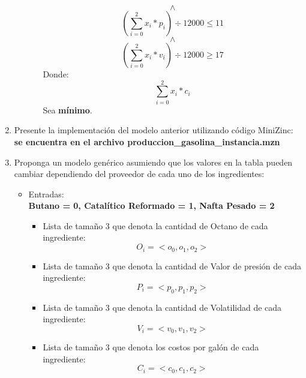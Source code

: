 \documentclass[12pt]{article}
\begin{document}
\begin{enumerate}[label=\alph*]
\begin{justify}
\begin{itemize}
\begin{itemize}
\begin{equation*}
\land
\end{equation*}
\begin{equation*}
(\sum_{i = 0}^{2} x_{i} * p_{i}) \div 12000 \leq 11
\end{equation*}
\begin{equation*}
\land
\end{equation*}
\begin{equation*}
(\sum_{i = 0}^{2} x_{i} * v_{i}) \div 12000 \geq 17
\end{equation*}
Donde:
\begin{equation*}
\sum_{i = 0}^{2} x_{i} * c_{i}
\end{equation*}
Sea \textbf{mínimo}.
\end{itemize}
\end{itemize}
\end{justify}
\item Presente la implementación del modelo anterior utilizando código MiniZinc: \textbf{se encuentra en el archivo produccion\_gasolina\_instancia.mzn}
\item Proponga un modelo genérico asumiendo que los valores en la tabla pueden cambiar dependiendo del
proveedor de cada uno de los ingredientes:
\begin{justify}
\begin{itemize}
\item Entradas:
\\
\textbf{Butano = 0, Catalítico Reformado = 1, Nafta Pesado = 2}
\begin{itemize}
\item Lista de tamaño 3 que denota la cantidad de Octano de cada ingrediente:
\begin{equation*}
O_{i} = <o_{0},o_{1},o_{2}>
\end{equation*}
\item Lista de tamaño 3 que denota la cantidad de Valor de presión de cada ingrediente:
\begin{equation*}
P_{i} = <p_{0},p_{1},p_{2}>
\end{equation*}
\item Lista de tamaño 3 que denota la cantidad de Volatilidad de cada ingrediente:
\begin{equation*}
V_{i} = <v_{0},v_{1},v_{2}>
\end{equation*}
\item Lista de tamaño 3 que denota los costos por galón de cada ingrediente:
\begin{equation*}
C_{i} = <c_{0},c_{1},c_{2}>
\end{equation*}

\end{itemize}
\end{itemize}
\end{justify}
\end{enumerate}
\end{document}
